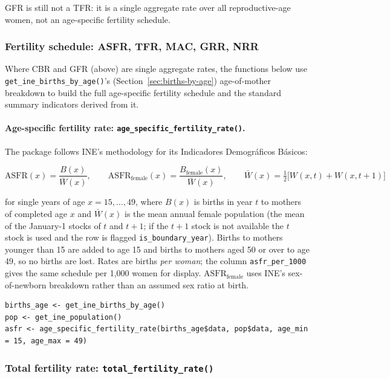 \documentclass[11pt]{article}
\newcommand{\fn}[1]{\texttt{#1}}
\begin{document}
GFR is still not a TFR: it is a single aggregate rate over all
reproductive-age women, not an age-specific fertility schedule.

\subsubsection{Fertility schedule: ASFR, TFR, MAC, GRR, NRR}
\label{sec:fertility-schedule}

Where CBR and GFR (above) are single aggregate rates, the functions below
use \fn{get\_ine\_births\_by\_age()}'s (Section~\ref{sec:births-by-age})
age-of-mother breakdown to build the full age-specific fertility schedule
and the standard summary indicators derived from it.

\paragraph{Age-specific fertility rate: \fn{age\_specific\_fertility\_rate()}.}
The package follows INE's methodology for its Indicadores Demogr\'aficos
B\'asicos:

\begin{equation}
\mathrm{ASFR}(x) = \frac{B(x)}{\bar W(x)}, \qquad
\mathrm{ASFR}_{\text{female}}(x) = \frac{B_{\text{female}}(x)}{\bar W(x)}, \qquad
\bar W(x) = \tfrac{1}{2}\bigl[W(x,t) + W(x,t+1)\bigr]
\end{equation}

for single years of age $x = 15, \dots, 49$, where $B(x)$ is births in year
$t$ to mothers of completed age $x$ and $\bar W(x)$ is the mean annual
female population (the mean of the January-1 stocks of $t$ and $t+1$; if
the $t+1$ stock is not available the $t$ stock is used and the row is
flagged \fn{is\_boundary\_year}). Births to mothers younger than 15 are added
to age 15 and births to mothers aged 50 or over to age 49, so no births are
lost. Rates are births \emph{per woman}; the column \fn{asfr\_per\_1000}
gives the same schedule per 1{,}000 women for display.
$\mathrm{ASFR}_{\text{female}}$ uses INE's sex-of-newborn breakdown rather
than an assumed sex ratio at birth.

\begin{lstlisting}
births_age <- get_ine_births_by_age()
pop <- get_ine_population()
asfr <- age_specific_fertility_rate(births_age$data, pop$data, age_min = 15, age_max = 49)
\end{lstlisting}

\subsubsection{Total fertility rate: \fn{total\_fertility\_rate()}}
\end{document}
